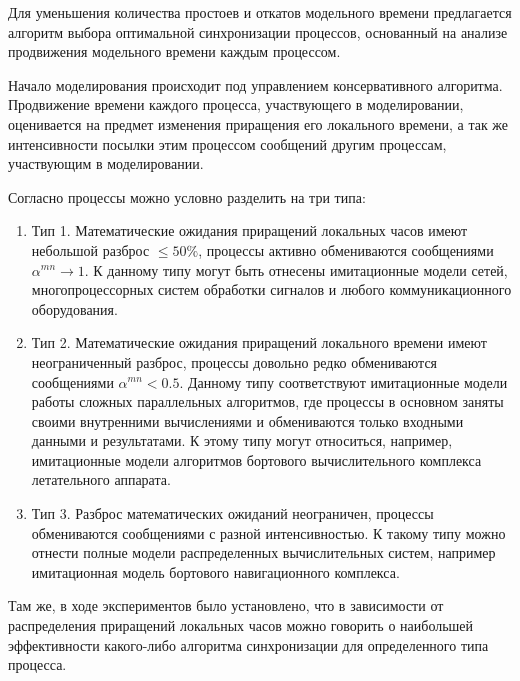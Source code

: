 Для уменьшения количества простоев и откатов модельного времени предлагается алгоритм выбора оптимальной синхронизации процессов, основанный на анализе продвижения модельного времени каждым процессом.

Начало моделирования происходит под управлением консервативного алгоритма. Продвижение времени каждого процесса, участвующего в моделировании, оценивается на предмет изменения приращения его локального времени, а так же интенсивности посылки этим процессом сообщений другим процессам, участвующим в моделировании.

Согласно \cite{voz-disser} процессы можно условно разделить на три типа: 
\begin{enumerate}
  \item Тип 1. Математические ожидания приращений локальных часов имеют небольшой разброс $\leqslant 50\%$, процессы активно обмениваются сообщениями $\alpha^{mn}\rightarrow 1$. К данному типу могут быть отнесены имитационные модели сетей, многопроцессорных систем обработки сигналов и любого коммуникационного оборудования.
  \item Тип 2. Математические ожидания приращений локального времени имеют неограниченный разброс, процессы довольно редко обмениваются сообщениями $\alpha^{mn}<0.5$. Данному типу соответствуют имитационные модели работы сложных параллельных алгоритмов, где процессы в основном заняты своими внутренними вычислениями и обмениваются только входными данными и результатами. К этому типу могут относиться, например, имитационные модели алгоритмов бортового вычислительного комплекса летательного аппарата.
  \item Тип 3. Разброс математических ожиданий неограничен, процессы обмениваются сообщениями с разной интенсивностью. К такому типу можно отнести полные модели распределенных вычислительных систем, например имитационная модель бортового навигационного комплекса.
\end{enumerate}

Там же, в ходе экспериментов было установлено, что в зависимости от распределения приращений локальных часов можно говорить о наибольшей эффективности какого-либо алгоритма синхронизации для определенного типа процесса.

